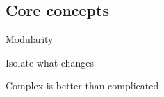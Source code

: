 \subsection{Core concepts}

\begin{frame}{Modularity}
	
\end{frame}

\begin{frame}{Isolate what changes}
	
\end{frame}

\begin{frame}{Complex is better than complicated}

\end{frame}




